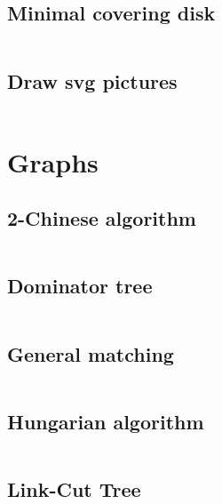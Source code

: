 \documentclass{article}
\begin{document}
\subsection{Minimal covering disk}
\inputminted[mathescape, breaklines, breakafter=(, tabsize=2, frame=lines, showtabs, tab=|\ , tabcolor=lightgray]{c++}{./geometry/min-disk/min-disk.cpp}
\subsection{Draw svg pictures}
\inputminted[mathescape, breaklines, breakafter=(, tabsize=2, frame=lines, showtabs, tab=|\ , tabcolor=lightgray]{c++}{./geometry/svg-draw/svg-draw.cpp}
\section{Graphs}
\subsection{2-Chinese algorithm}
\inputminted[mathescape, breaklines, breakafter=(, tabsize=2, frame=lines, showtabs, tab=|\ , tabcolor=lightgray]{c++}{./graphs/2-chinese/2-chinese.cpp}
\subsection{Dominator tree}
\inputminted[mathescape, breaklines, breakafter=(, tabsize=2, frame=lines, showtabs, tab=|\ , tabcolor=lightgray]{c++}{./graphs/dominator-tree/dominator-tree.cpp}
\subsection{General matching}
\inputminted[mathescape, breaklines, breakafter=(, tabsize=2, frame=lines, showtabs, tab=|\ , tabcolor=lightgray]{c++}{./graphs/general-matching/general-matching.cpp}
\subsection{Hungarian algorithm}
\inputminted[mathescape, breaklines, breakafter=(, tabsize=2, frame=lines, showtabs, tab=|\ , tabcolor=lightgray]{c++}{./graphs/hungarian-algorithm/hungarian-algorithm.cpp}
\subsection{Link-Cut Tree}
\inputminted[mathescape, breaklines, breakafter=(, tabsize=2, frame=lines, showtabs, tab=|\ , tabcolor=lightgray]{c++}{./graphs/link-cut-tree/link-cut-tree.cpp}
\end{document}
